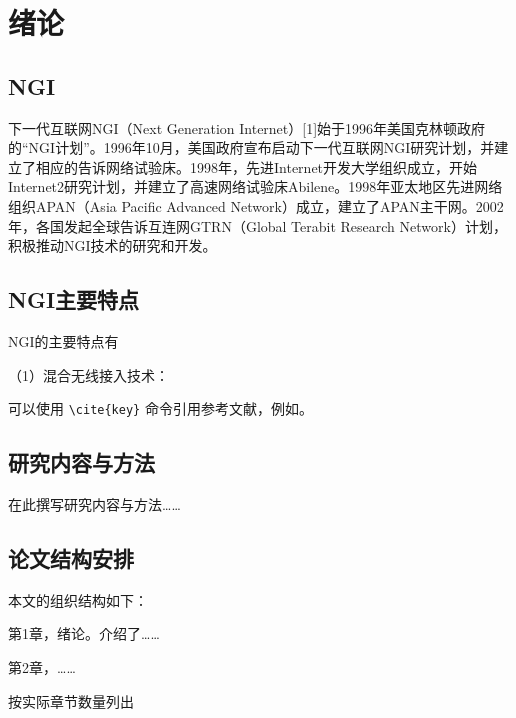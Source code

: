 \chapter{绪论}

\section{NGI}

下一代互联网NGI（Next Generation Internet）[1]始于1996年美国克林顿政府的“NGI计划”。1996年10月，美国政府宣布启动下一代互联网NGI研究计划，并建立了相应的告诉网络试验床。1998年，先进Internet开发大学组织成立，开始Internet2研究计划，并建立了高速网络试验床Abilene。1998年亚太地区先进网络组织APAN（Asia Pacific Advanced Network）成立，建立了APAN主干网。2002年，各国发起全球告诉互连网GTRN（Global Terabit Research Network）计划，积极推动NGI技术的研究和开发。

\section{NGI主要特点}

NGI的主要特点有

（1）混合无线接入技术：

可以使用 \verb|\cite{key}| 命令引用参考文献，例如\cite{7956190}。

\section{研究内容与方法}

在此撰写研究内容与方法……

\section{论文结构安排}

本文的组织结构如下：

第1章，绪论。介绍了……

第2章，……

按实际章节数量列出
